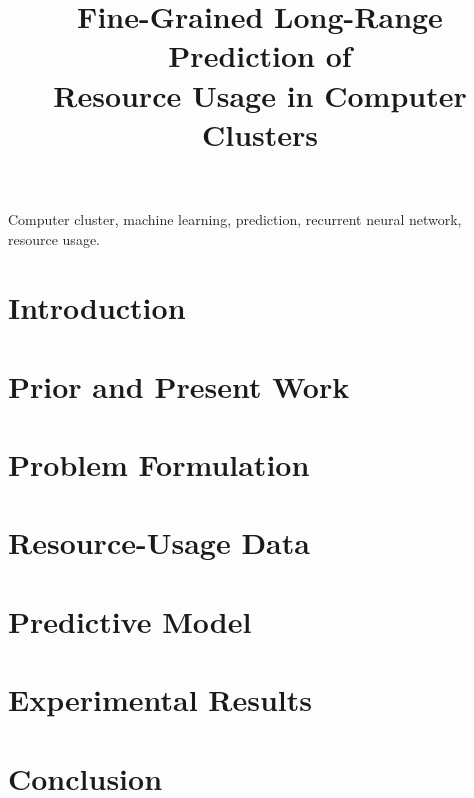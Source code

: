 \documentclass[journal]{IEEEtran}
\title{
  Fine-Grained Long-Range Prediction of\\
  Resource Usage in Computer Clusters
}
\author{}
\begin{document}
  \maketitle

  \begin{abstract}
    
  \end{abstract}

  \begin{IEEEkeywords}
    Computer cluster,
    machine learning,
    prediction,
    recurrent neural network,
    resource usage.
  \end{IEEEkeywords}


  \section{Introduction} 
  

  \section{Prior and Present Work} 
  

  \section{Problem Formulation} 
  

  \section{Resource-Usage Data} 
  

  \section{Predictive Model} 
  

  \section{Experimental Results} 
  

  \section{Conclusion} 
  

  
  
\end{document}
